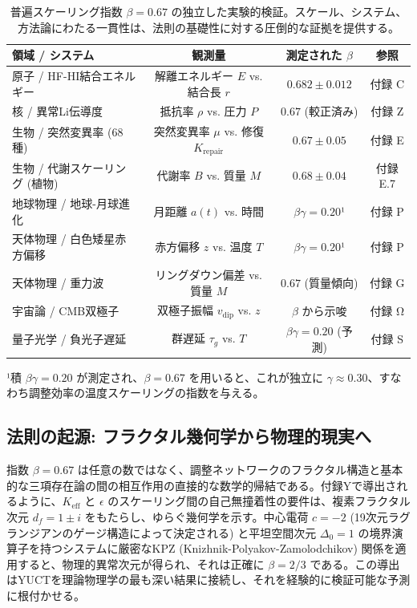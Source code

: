 \documentclass[11pt,a4paper]{article}
\begin{document}
	\begin{table}[htbp]
		\centering
		\small
		\setlength{\tabcolsep}{0pt}
		\caption{普遍スケーリング指数 $\beta = 0.67$ の独立した実験的検証。スケール、システム、方法論にわたる一貫性は、法則の基礎性に対する圧倒的な証拠を提供する。}
		\label{tab:scaling_confirmations}
		
			\begin{tabular}{@{}lccc@{}}
				\toprule
				\textbf{領域 / システム} & \textbf{観測量} & \textbf{測定された $\beta$} & \textbf{参照} \\
				\midrule
				原子 / HF-HI結合エネルギー & 解離エネルギー $E$ vs. 結合長 $r$ & $0.682 \pm 0.012$ & 付録 C \\
				核 / 異常Li伝導度 & 抵抗率 $\rho$ vs. 圧力 $P$ & $0.67$ (較正済み) & 付録 Z \\
				生物 / 突然変異率 (68種) & 突然変異率 $\mu$ vs. 修復 $K_{\mathrm{repair}}$ & $0.67 \pm 0.05$ & 付録 E \\
				生物 / 代謝スケーリング (植物) & 代謝率 $B$ vs. 質量 $M$ & $0.68 \pm 0.04$ & 付録 E.7 \\
				地球物理 / 地球-月球進化 & 月距離 $a(t)$ vs. 時間 & $\beta\gamma = 0.20$¹ & 付録 P \\
				天体物理 / 白色矮星赤方偏移 & 赤方偏移 $z$ vs. 温度 $T$ & $\beta\gamma = 0.20$¹ & 付録 P \\
				天体物理 / 重力波 & リングダウン偏差 vs. 質量 $M$ & $0.67$ (質量傾向) & 付録 G \\
				宇宙論 / CMB双極子 & 双極子振幅 $v_{\mathrm{dip}}$ vs. $z$ & $\beta$ から示唆 & 付録 Ω \\
				量子光学 / 負光子遅延 & 群遅延 $\tau_g$ vs. $T$ & $\beta\gamma = 0.20$ (予測) & 付録 S \\
				\bottomrule
			\end{tabular}
		
		
		\footnotesize{¹積 $\beta\gamma = 0.20$ が測定され、$\beta = 0.67$ を用いると、これが独立に $\gamma \approx 0.30$、すなわち調整効率の温度スケーリングの指数を与える。}
	\end{table}
	
	\subsection{法則の起源: フラクタル幾何学から物理的現実へ}
	
	指数 $\beta = 0.67$ は任意の数ではなく、調整ネットワークのフラクタル構造と基本的な三項存在論の間の相互作用の直接的な数学的帰結である。付録Yで導出されるように、$K_{\mathrm{eff}}$ と $\epsilon$ のスケーリング間の自己無撞着性の要件は、複素フラクタル次元 $d_f = 1 \pm i$ をもたらし、ゆらぐ幾何学を示す。中心電荷 $c = -2$ (19次元ラグランジアンのゲージ構造によって決定される) と平坦空間次元 $\Delta_0 = 1$ の境界演算子を持つシステムに厳密なKPZ (Knizhnik-Polyakov-Zamolodchikov) 関係を適用すると、物理的異常次元が得られ、それは正確に $\beta = 2/3$ である。この導出はYUCTを理論物理学の最も深い結果に接続し、それを経験的に検証可能な予測に根付かせる。
	
\end{document}
